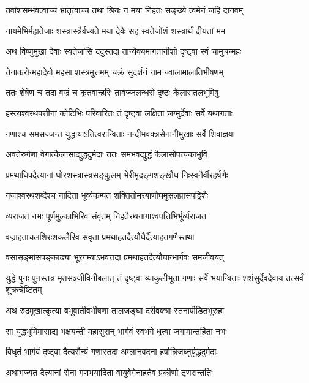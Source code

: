 \twolineshloka
{तवांशसम्भवत्वाच्च भ्रातृत्वाच्च तथा श्रियः}
{न मया निहतः सङ्ख्ये त्वमेनं जहि दानवम्} %


\twolineshloka
{नायमेभिर्महातेजाः शस्त्रास्त्रैर्वध्यते मया}
{देवैः सह स्वतेजोंशं शस्त्रार्थं दीयतां मम} %


\twolineshloka
{अथ विष्णुमुखा देवाः स्वतेजांसि ददुस्तदा}
{तान्यैक्यमागतानीशो दृष्ट्वा स्वं चामुचन्महः} %

\twolineshloka
{तेनाकरोन्महादेवो महसा शस्त्रमुत्तमम्}
{चक्रं सुदर्शनं नाम ज्वालामालातिभीषणम्} %

\twolineshloka
{ततः शेषेण च तदा वज्रं च कृतवान्हरिः}
{तावज्जलन्धरो दृष्टः कैलासतलभूमिषु} %

\twolineshloka
{हस्त्यश्वरथपत्तीनां कोटिभिः परिवारितः}
{तं दृष्ट्वा लक्षिता जग्मुर्देवाः सर्वे यथागताः} %

\twolineshloka
{गणाश्च समसज्जन्त युद्धायाऽतित्वरान्विताः}
{नन्दीभवक्त्रसेनानीमुखाः सर्वे शिवाज्ञया} %

\twolineshloka
{अवतेरुर्गणा वेगात्कैलासाद्युद्धदुर्मदाः}
{ततः समभवद्युद्धं कैलासोपत्यकाभुवि} %

\twolineshloka
{प्रमथाधिपदैत्यानां घोरशस्त्रास्त्रसङ्कुलम्}
{भेरीमृदङ्गशङ्खौघ निःस्वनैर्वीरहर्षणैः} %

\twolineshloka
{गजाश्वरथशब्दैश्च नादिता भूर्व्यकम्पत}
{शक्तितोमरबाणौघमुसलप्रासपट्टिशैः} %

\twolineshloka
{व्यराजत नभः पूर्णमुल्काभिरिव संवृतम्}
{निहतैरथनागाश्वपत्तिभिर्भूर्व्यराजत} %

\twolineshloka
{वज्राहताचलशिरःशकलैरिव संवृता}
{प्रमथाहतदैत्यौघैर्दैत्याहतगणैस्तथा} %

\twolineshloka
{वसासृङ्मांसपङ्काढ्या भूरगम्याऽभवत्तदा}
{प्रमथाहतदैत्यौघान्भार्गवः समजीवयत्} %

\threelineshloka
{युद्धे पुनः पुनस्तत्र मृतसञ्जीविनीबलात्}
{तं दृष्ट्वा व्याकुलीभूता गणाः सर्वे भयान्विताः}
{शशंसुर्देवदेवाय तत्सर्वं शुक्रचेष्टितम्} %

\twolineshloka
{अथ रुद्रमुखात्कृत्या बभूवातीवभीषणा}
{तालजङ्घा दरीवक्त्रा स्तनापीडितभूरुहा} %

\twolineshloka
{सा युद्धभूमिमासाद्य भक्षयन्ती महासुरान्}
{भार्गवं स्वभगे धृत्वा जगामान्तर्हिता नभः} %

\twolineshloka
{विधृतं भार्गवं दृष्ट्वा दैत्यसैन्यं गणास्तदा}
{अम्लानवदना हर्षान्निजघ्नुर्युद्धदुर्मदाः} %

\twolineshloka
{अथाभज्यत दैत्यानां सेना गणभयार्दिता}
{वायुवेगेनाहतेव प्रकीर्णा तृणसन्ततिः} %

